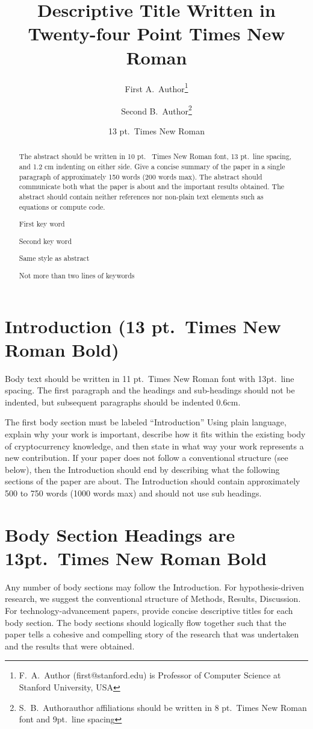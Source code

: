 \documentclass{ledger}
\title{Descriptive Title Written in Twenty-four Point Times New Roman}
\author{First A.~Author\thanks{F.~A.~Author (first@stanford.edu) is Professor of Computer Science at Stanford University, USA}\and Second B.~Author\thanks{S.~B.~Author\textellipsis author affiliations should be written in 8 pt.~Times New Roman font and 9pt.~line spacing}\and 13 pt.~Times New Roman}
\begin{document}
\maketitle

\begin{abstract}
The abstract should be written in 10 pt.~ Times New Roman font, 13 pt.~line spacing, and 1.2 cm indenting on either side.  Give a concise summary of the paper in a single paragraph of approximately 150 words (200 words max).  The abstract should communicate both what the paper is about and the important results obtained.  The abstract should contain neither references nor non-plain text elements such as equations or compute code.

\begin{keywords}
\item First key word
\item Second key word
\item Same style as abstract
\item Not more than two lines of keywords
\end{keywords}
\end{abstract}

\section{Introduction (13 pt.\ Times New Roman Bold)}

Body text should be written in 11 pt.\ Times New Roman font with 13pt.\ line spacing.  The first paragraph and the headings and sub-headings should not be indented, but subsequent paragraphs should be indented 0.6cm.

The first body section must be labeled ``Introduction''  Using plain language, explain why your work is important, describe how it fits within the existing body of cryptocurrency knowledge, and then state in what way your work represents a new contribution.  If your paper does not follow a conventional structure (see below), then the Introduction should end by describing what the following sections of the paper are about.  The Introduction should contain approximately 500 to 750 words (1000 words max) and should not use sub headings.

\section{Body Section Headings are 13pt.\ Times New Roman Bold}

Any number of body sections may follow the Introduction.  For hypothesis-driven research, we suggest the conventional structure of Methods, Results, Discussion.  For technology-advancement papers, provide concise descriptive titles for each body section.  The body sections should logically flow together such that the paper tells a cohesive and compelling story of the research that was undertaken and the results that were obtained.
\end{document}
